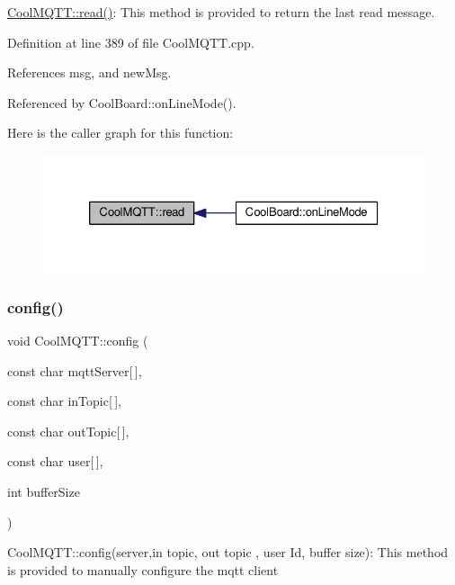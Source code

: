\hyperlink{class_cool_m_q_t_t_ae3c18f6ae9723746d32765f1c8f176ca}{Cool\+M\+Q\+T\+T\+::read()}\+: This method is provided to return the last read message. 

Definition at line 389 of file Cool\+M\+Q\+T\+T.\+cpp.



References msg, and new\+Msg.



Referenced by Cool\+Board\+::on\+Line\+Mode().

Here is the caller graph for this function\+:\nopagebreak
\begin{figure}[H]
\begin{center}
\leavevmode
\includegraphics[width=326pt]{d0/dd0/class_cool_m_q_t_t_ae3c18f6ae9723746d32765f1c8f176ca_icgraph}
\end{center}
\end{figure}
\mbox{\label{class_cool_m_q_t_t_a9b703de4f1358f0ee7a5e8c44979c648}} 
\subsubsection{\texorpdfstring{config()}{config()}\hspace{0.1cm}{\footnotesize\ttfamily [1/2]}}
{\footnotesize\ttfamily void Cool\+M\+Q\+T\+T\+::config (\begin{DoxyParamCaption}\item[{const char}]{mqtt\+Server\mbox{[}$\,$\mbox{]},  }\item[{const char}]{in\+Topic\mbox{[}$\,$\mbox{]},  }\item[{const char}]{out\+Topic\mbox{[}$\,$\mbox{]},  }\item[{const char}]{user\mbox{[}$\,$\mbox{]},  }\item[{int}]{buffer\+Size }\end{DoxyParamCaption})}

Cool\+M\+Q\+T\+T\+::config(server,in topic, out topic , user Id, buffer size)\+: This method is provided to manually configure the mqtt client 

